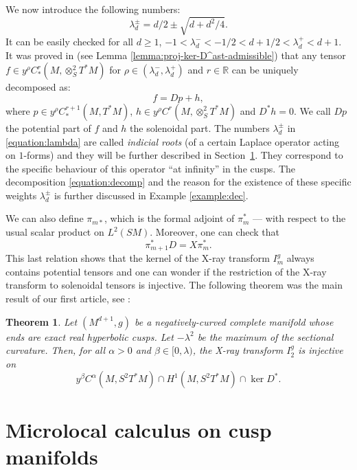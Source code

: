 \documentclass[JEP,XML,SOM,Unicode,NoFloatCountersInSection]{cedram}
\newcommand{\R}{\mathbb{R}}
\theoremstyle{plain}
\newtheorem{theorem}{Theorem}[section]
\theoremstyle{definition}
\begin{document}
We now introduce the following numbers:
\begin{equation}
\label{equation:lambda}
\lambda_d^\pm = d/2 \pm \sqrt{d+d^2/4}.
\end{equation}
It can be easily checked for all $d \geq 1$, $-1 < \lambda_d^- < -1/2 < d+1/2 <\lambda_d^+ < d+1$. It was proved in \cite[Lem.\,5.5]{Bonthonneau-Lefeuvre-19-1} (see Lemma \ref{lemma:proj-ker-D^ast-admissible}) that any tensor $f \in y^\rho C^r_*(M,\otimes^2_S T^*M)$ for $\rho \in (\lambda_d^-, \lambda_d^+)$ and $r \in \R$ can be uniquely decomposed as:
\begin{equation}
\label{equation:decomp}
f = Dp + h,
\end{equation}
where $p \in y^\rho C^{r+1}_*(M, T^*M)$, $h \in y^\rho C^r(M,\otimes^2_S T^*M)$ and $D^*h = 0$. We call $Dp$ the potential part of $f$ and $h$ the solenoidal part. The numbers $\lambda_d^\pm$ in \eqref{equation:lambda} are called \emph{indicial roots} (of a certain Laplace operator acting on $1$-forms) and they will be further described in Section~\ref{sec:microlocal-cusp}. They correspond to the specific behaviour of this operator ``at infinity'' in the cusps. The decomposition \eqref{equation:decomp} and the reason for the existence of these specific weights $\lambda_d^\pm$ is further discussed in Example \ref{example:dec}.

We can also define $\pi_{m\ast}$, which is the formal adjoint of $\pi_m^\ast$ --- with respect to the usual scalar product on $L^2(SM)$. Moreover, one can check that
\[
\pi^\ast_{m+1} D = X\pi^\ast_m.
\]
This last relation shows that the kernel of the X-ray transform $I^g_m$ always contains potential tensors and one can wonder if the restriction of the X-ray transform to solenoidal tensors is injective. The following theorem was the main result of our first article, see \cite[Th.\,1]{Bonthonneau-Lefeuvre-19-1}:
\begin{theorem}
\label{theorem:xray-injectivite}
Let $(M^{d+1},g)$ be a negatively-curved complete manifold whose ends are exact real hyperbolic cusps. Let $-\lambda^2$ be the maximum of the sectional curvature. Then, for all $\alpha > 0$ and $\beta \in [0,\lambda)$, the X-ray transform $I^{g}_2$ is injective on
\[
y^\beta C^\alpha(M, S^2 T^*M) \cap H^1(M, S^2 T^*M) \cap \ker D^*.
\]
\end{theorem}

\section{Microlocal calculus on cusp manifolds}
\label{sec:microlocal-cusp}
\end{document}
